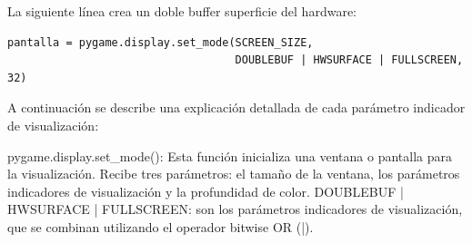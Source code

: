 La siguiente línea crea un doble buffer superficie del hardware:
\begin{lstlisting}		
pantalla = pygame.display.set_mode(SCREEN_SIZE, 
                                   DOUBLEBUF | HWSURFACE | FULLSCREEN, 32)
\end{lstlisting}

A continuación  se describe una  explicación detallada de cada parámetro indicador de visualización:

{\ttfamily pygame.display.set\_mode()}: Esta función inicializa una ventana o pantalla para la visualización. 
Recibe tres parámetros: el tamaño de la ventana, los parámetros indicadores de visualización y la profundidad de color.
{\ttfamily DOUBLEBUF | HWSURFACE | FULLSCREEN}:  son los parámetros indicadores de visualización, que se combinan utilizando el operador {\ttfamily bitwise OR (|)}. \\


